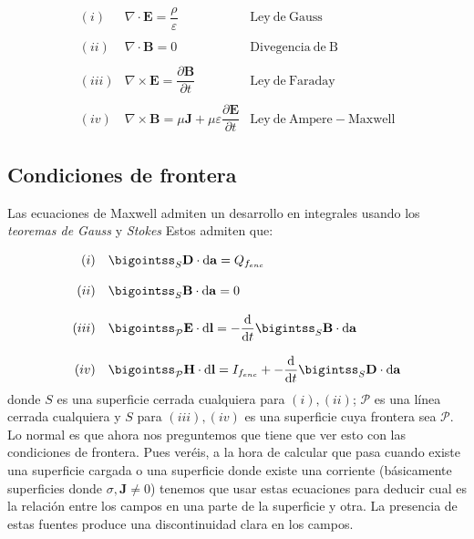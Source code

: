\documentclass[12pt,a4paper]{article}
\newcommand{\D}{\mathrm{d}}
\newcommand{\rota}{\nabla \times}
\newcommand{\dive}{\nabla \cdot}
\newcommand{\Bn}{\mathbf{B}}
\newcommand{\En}{\mathbf{E}}
\newcommand{\Dn}{\mathbf{D}}
\newcommand{\Hn}{\mathbf{H}}
\newcommand{\Jn}{\mathbf{J}}
\newcommand{\an}{\mathbf{a}}
\newcommand{\lnn}{\mathbf{l}}
\numberwithin{equation}{section}
\numberwithin{figure}{section}
\begin{document}
\begin{equation}
\begin{array}{rll}
(i) & \dive \En =  \dfrac{\rho}{\varepsilon} & \mathrm{Ley \ de \ Gauss} \\ \\
(ii) & \dive \Bn = 0  & \mathrm{Divegencia \ de \ B} \\ \\
(iii) & \rota \En = \dfrac{\partial \Bn}{ \partial t}  & \mathrm{Ley \ de \ Faraday} \\ \\
(iv) & \rota \Bn=  \mu \Jn +  \mu \varepsilon \dfrac{\partial \En}{\partial t} & \mathrm{Ley \ de \ Ampere-Maxwell} 
\end{array} \label{Ec:01.5.32}
\end{equation}

\subsection{Condiciones de frontera}

Las ecuaciones de Maxwell admiten un desarrollo en integrales usando los \textit{teoremas de Gauss} y \textit{Stokes} Estos admiten que:


\begin{equation}
\begin{array}{rl}
(i) & \bigointss_S \Dn \cdot \D \an =  Q_{f_{enc}}  \\ \\
(ii) & \bigointss_S \Bn \cdot \D \an = 0   \\ \\
(iii) & \bigointss_{\mathcal{P}} \En \cdot \D \lnn = -  \dfrac{\D }{ \D t}  \bigintss_S \Bn \cdot \D \an  \\ \\
(iv) & \bigointss_{\mathcal{P}} \Hn \cdot \D \lnn =  I_{f_{enc}} +   -  \dfrac{\D }{ \D t}  \bigintss_S \Dn \cdot \D \an 
\end{array} \label{Ec:01.4.18}
\end{equation}
donde $S$ es una superficie cerrada cualquiera para $(i),(ii)$; $\mathcal{P}$ es una línea cerrada cualquiera y $S$ para $(iii),(iv)$ es una superficie cuya frontera sea $\mathcal{P}$. \\

Lo normal es que ahora nos preguntemos que tiene que ver esto con las condiciones de frontera. Pues veréis, a la hora de calcular que pasa cuando existe una superficie cargada o una superficie donde existe una corriente (básicamente superficies donde $\sigma,\Jn \neq 0$) tenemos que usar estas ecuaciones para deducir cual es la relación entre los campos en una parte de la superficie y otra. La presencia de estas fuentes produce una discontinuidad clara en los campos. \\
\end{document}

